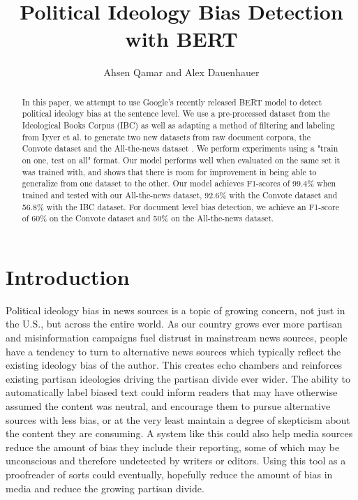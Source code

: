 \documentclass[10pt,a4paper,onecolumn]{article}
\title{Political Ideology Bias Detection with BERT}
\author{Ahsen Qamar and Alex Dauenhauer}
\begin{document}
\maketitle

\begin{abstract}
In this paper, we attempt to use Google's recently released BERT model to detect political ideology bias at the sentence level. We use a pre-processed dataset from the Ideological Books Corpus (IBC) \cite{iyyerRNN} as well as adapting a method of filtering and labeling from Iyyer et al. \cite{iyyerRNN} to generate two new datasets from raw document corpora, the Convote dataset \cite{convote} and the All-the-news dataset \cite{news}. We perform experiments using a "train on one, test on all" format. Our model performs well when evaluated on the same set it was trained with, and shows that there is room for improvement in being able to generalize from one dataset to the other. Our model achieves F1-scores of 99.4\% when trained and tested with our All-the-news dataset, 92.6\% with the Convote dataset and 56.8\% with the IBC dataset. For document level bias detection, we achieve an F1-score of 60\% on the Convote dataset and 50\% on the All-the-news dataset.
\end{abstract}

\section{Introduction}
\label{intro}
Political ideology bias in news sources is a topic of growing concern, not just in the U.S., but across the entire world. As our country grows ever more partisan and misinformation campaigns fuel distrust in mainstream news sources, people have a tendency to turn to alternative news sources which typically reflect the existing ideology bias of the author. This creates echo chambers and reinforces existing partisan ideologies driving the partisan divide ever wider. The ability to automatically label biased text could inform readers that may have otherwise assumed the content was neutral, and encourage them to pursue alternative sources with less bias, or at the very least maintain a degree of skepticism about the content they are consuming. A system like this could also help media sources reduce the amount of bias they include their reporting, some of which may be unconscious and therefore undetected by writers or editors. Using this tool as a proofreader of sorts could eventually, hopefully reduce the amount of bias in media and reduce the growing partisan divide.
\end{document}
